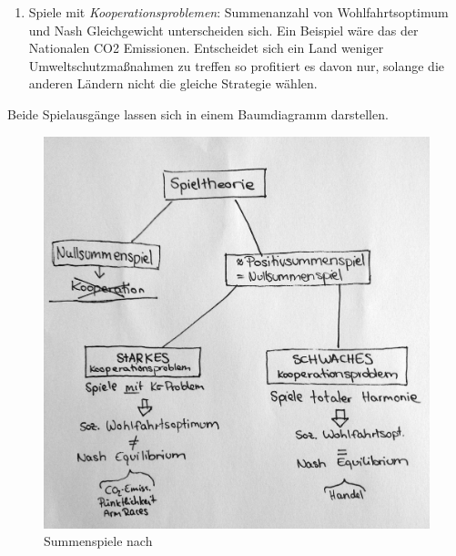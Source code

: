 {\begin{enumerate}
			\begin{quote}
				``Wer sein eigenes Interesse verfolgt, befördert das Wohl der Gesamtgesellschaft häufig wirkungsvoller, als wenn er wirklich beabsichtigt, es zu fördern. Ich habe nie erlebt, dass viel Gutes von denen erreicht wurde, die vorgaben, für das öffentliche Wohl zu handeln.'' \emph{Adam Smith ``Wealth of Nations''}
			\end{quote}

		\item Spiele mit \emph{Kooperationsproblemen}: Summenanzahl von Wohlfahrtsoptimum und Nash Gleichgewicht unterscheiden sich.
		Ein Beispiel wäre das der Nationalen CO2 Emissionen. Entscheidet sich ein Land weniger Umweltschutzmaßnahmen zu treffen so profitiert es davon nur, solange die anderen Ländern nicht die gleiche Strategie wählen.

\end{enumerate}

Beide Spielausgänge lassen sich in einem Baumdiagramm darstellen.

\begin{figure}[htbp]
	\begin{center}
	\includegraphics[width=1\textwidth]{img/summenspiele.jpg}
	\caption{Summenspiele nach \cite{Kleinberg-2009-oz}}
	\label{fig:gefangenendilemma}
	\end{center}
\end{figure}


}
